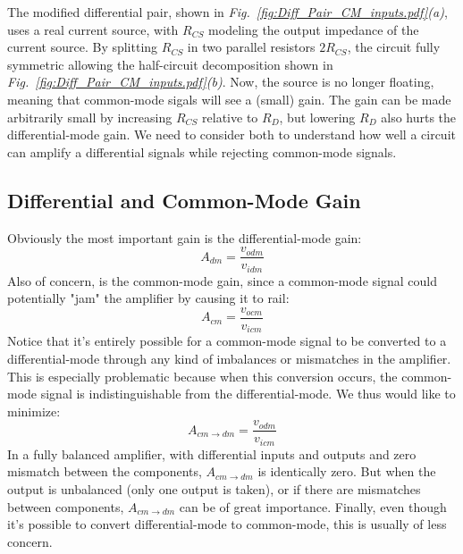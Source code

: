 The modified differential pair, shown in \emph{Fig.~\ref{fig:Diff_Pair_CM_inputs.pdf}(a)}, uses a real current source, with $R_{CS}$ modeling the output impedance of the current source.  By splitting $R_{CS}$ in two parallel resistors $2R_{CS}$, the circuit fully symmetric allowing the half-circuit decomposition shown in \emph{Fig.~\ref{fig:Diff_Pair_CM_inputs.pdf}(b)}.  Now, the source is no longer floating, meaning that common-mode sigals will see a (small) gain.  The gain can be made arbitrarily small by increasing $R_{CS}$ relative to $R_D$, but lowering $R_D$ also hurts the differential-mode gain.  We need to consider both to understand how well a circuit can amplify a differential signals while rejecting common-mode signals.
\subsection{Differential and Common-Mode Gain}
Obviously the most important gain is the differential-mode gain:
    \begin{equation}
        A_{dm} = \frac{v_{odm}}{v_{idm}}
    \end{equation}
Also of concern, is the common-mode gain, since a common-mode signal could potentially "jam" the amplifier by causing it to rail:
    \begin{equation}
        A_{cm} = \frac{v_{ocm}}{v_{icm}}
    \end{equation}
Notice that it's entirely possible for a common-mode signal to be converted to a differential-mode through any kind of imbalances or mismatches in the amplifier.  This is especially problematic because when this conversion occurs, the common-mode signal is indistinguishable from the differential-mode.  We thus would like to minimize:
    \begin{equation}
        A_{cm \to dm} = \frac{v_{odm}}{v_{icm}}
    \end{equation}
In a fully balanced amplifier, with differential inputs and outputs and zero mismatch between the components, $A_{cm \to dm}$ is identically zero.  But when the output is unbalanced (only one output is taken), or if there are mismatches between components, $A_{cm \to dm}$ can be of great importance.  Finally, even though it's possible to convert differential-mode to common-mode, this is usually of less concern.  

